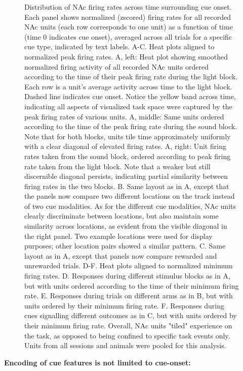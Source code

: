 \documentclass[11pt]{article}
\begin{document}
\begin{figure}[h]
\caption{Distribution of NAc firing rates across time surrounding cue onset. Each panel shows normalized (zscored) firing rates for all recorded NAc units (each row corresponds to one unit) as a function of time (time 0 indicates cue onset), averaged across all trials for a specific cue type, indicated by text labels. A-C. Heat plots aligned to normalized peak firing rates. A, left: Heat plot showing smoothed normalized firing activity of all recorded NAc units ordered according to the time of their peak firing rate during the light block. Each row is a unit’s average activity across time to the light block. Dashed line indicates cue onset. Notice the yellow band across time, indicating all aspects of visualized task space were captured by the peak firing rates of various units. A, middle: Same units ordered according to the time of the peak firing rate during the sound block. Note that for both blocks, units tile time approximately uniformly with a clear diagonal of elevated firing rates. A, right: Unit firing rates taken from the sound block, ordered according to peak firing rate taken from the light block. Note that a weaker but still discernible diagonal persists, indicating partial similarity between firing rates in the two blocks. B. Same layout as in A, except that the panels now compare two different locations on the track instead of two cue modalities. As for the different cue modalities, NAc units clearly discriminate between locations, but also maintain some similarity across locations, as evident from the visible diagonal in the right panel. Two example locations were used for display purposes; other location pairs showed a similar pattern. C. Same layout as in A, except that panels now compare rewarded and unrewarded trials. D-F. Heat plots aligned to normalized minimum firing rates. D. Responses during different stimulus blocks as in A, but with units ordered according to the time of their minimum firing rate. E. Responses during trials on different arms as in B, but with units ordered by their minimum firing rate. F. Responses during cues signalling different outcomes as in C, but with units ordered by their minimum firing rate. Overall, NAc units "tiled" experience on the task, as opposed to being confined to specific task events only. Units from all sessions and animals were pooled for this analysis.}
\label{fig:tiling}
\end{figure}
 
{\bf Encoding of cue features is not limited to cue-onset:}
\end{document}
